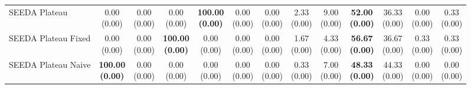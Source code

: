 \begin{table}[H]
{\begin{tabular}{l|cccccc|cccccc}
SEEDA Plateau & \makecell{0.00 \\ (0.00)} & \makecell{0.00 \\ (0.00)} & {\cellcolor[HTML]{C8E6C9}} \makecell{0.00 \\ (0.00)} & \bfseries \makecell{100.00 \\ (0.00)} & \makecell{0.00 \\ (0.00)} & \makecell{0.00 \\ (0.00)} & \makecell{2.33 \\ (0.00)} & \makecell{9.00 \\ (0.00)} & {\cellcolor[HTML]{C8E6C9}} \bfseries \makecell{52.00 \\ (0.00)} & \makecell{36.33 \\ (0.00)} & \makecell{0.00 \\ (0.00)} & \makecell{0.33 \\ (0.00)} \\
SEEDA Plateau Fixed & \makecell{0.00 \\ (0.00)} & \makecell{0.00 \\ (0.00)} & {\cellcolor[HTML]{C8E6C9}} \bfseries \makecell{100.00 \\ (0.00)} & \makecell{0.00 \\ (0.00)} & \makecell{0.00 \\ (0.00)} & \makecell{0.00 \\ (0.00)} & \makecell{1.67 \\ (0.00)} & \makecell{4.33 \\ (0.00)} & {\cellcolor[HTML]{C8E6C9}} \bfseries \makecell{56.67 \\ (0.00)} & \makecell{36.67 \\ (0.00)} & \makecell{0.33 \\ (0.00)} & \makecell{0.33 \\ (0.00)} \\
SEEDA Plateau Naive & \bfseries \makecell{100.00 \\ (0.00)} & \makecell{0.00 \\ (0.00)} & {\cellcolor[HTML]{C8E6C9}} \makecell{0.00 \\ (0.00)} & \makecell{0.00 \\ (0.00)} & \makecell{0.00 \\ (0.00)} & \makecell{0.00 \\ (0.00)} & \makecell{0.33 \\ (0.00)} & \makecell{7.00 \\ (0.00)} & {\cellcolor[HTML]{C8E6C9}} \bfseries \makecell{48.33 \\ (0.00)} & \makecell{44.33 \\ (0.00)} & \makecell{0.00 \\ (0.00)} & \makecell{0.00 \\ (0.00)} \\
\bottomrule
\end{tabular}
}%
\end{table}
